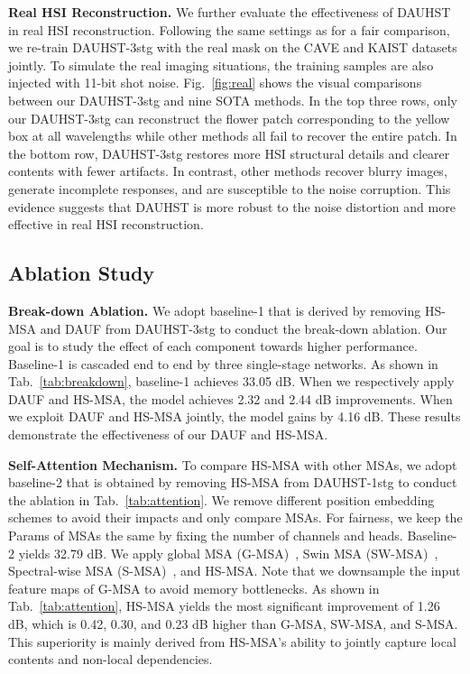 \documentclass{article}
\begin{document}
\textbf{Real HSI Reconstruction.} We further evaluate the effectiveness of DAUHST in real HSI reconstruction. Following the same settings as \cite{tsa_net,gsm,mst} for a fair comparison, we re-train  DAUHST-3stg with the real mask on the CAVE and KAIST datasets jointly. To simulate the real imaging situations, the training samples are also injected with 11-bit shot noise. 
Fig.~\ref{fig:real} shows the visual comparisons between our DAUHST-3stg and nine SOTA methods. In the top three rows, only our DAUHST-3stg can reconstruct the flower patch corresponding to the yellow box  at all wavelengths while other methods all fail to recover the entire patch. In the bottom row, DAUHST-3stg restores more HSI structural details and clearer contents with fewer artifacts. In contrast, other methods recover blurry images, generate incomplete responses, and are susceptible to the noise corruption. This evidence suggests that DAUHST is more robust to the noise distortion and more effective  in real HSI reconstruction.



\vspace{-1.5mm}
\subsection{Ablation Study}
\vspace{-1.5mm}

\textbf{Break-down Ablation.} We adopt baseline-1 that is derived by removing HS-MSA and DAUF from DAUHST-3stg to conduct the break-down ablation. Our goal is to study the effect of each component towards higher performance. Baseline-1 is cascaded end to end by three single-stage networks. As shown in Tab.~\ref{tab:breakdown}, baseline-1 achieves 33.05 dB. When we respectively apply DAUF and HS-MSA, the model achieves 2.32 and 2.44 dB improvements. When we exploit DAUF and HS-MSA jointly, the model gains by 4.16 dB.  These results demonstrate the effectiveness of our  DAUF and HS-MSA.

\textbf{Self-Attention Mechanism.} To compare HS-MSA with other MSAs, we adopt baseline-2 that is obtained by removing HS-MSA from DAUHST-1stg to conduct the ablation  in Tab.~\ref{tab:attention}. We remove different position embedding schemes to avoid their impacts and only compare  MSAs. For fairness, we keep the Params of MSAs the same by fixing the number of channels and heads. Baseline-2 yields 32.79 dB. We apply global MSA (G-MSA)~\cite{global_msa}, Swin MSA (SW-MSA)~\cite{liu2021swin}, Spectral-wise MSA (S-MSA)~\cite{mst}, and HS-MSA. Note that we downsample the input feature maps of G-MSA to avoid memory bottlenecks. As shown in Tab.~\ref{tab:attention}, HS-MSA yields the most significant improvement of 1.26 dB, which is 0.42, 0.30, and 0.23 dB higher than G-MSA, SW-MSA, and S-MSA. This superiority is mainly derived from HS-MSA's ability to jointly capture local contents and non-local dependencies. 
\end{document}
